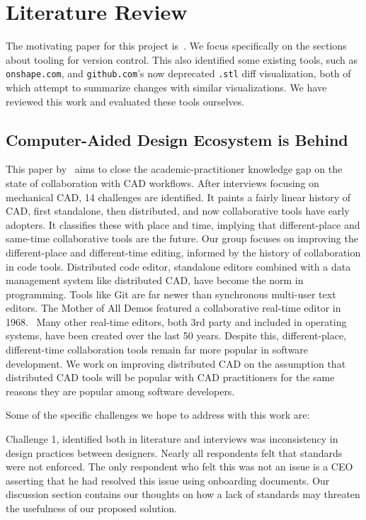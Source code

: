 \documentclass[sigconf,authorversion,nonacm]{acmart}
\begin{document}
\section{Literature Review}

The motivating paper for this project is~\citet{cheng2023age}.
We focus specifically on the sections about tooling for version control.
This also identified some existing tools, such as \texttt{onshape.com}, and \texttt{github.com}'s now deprecated \texttt{.stl} diff visualization, both of which attempt to summarize changes with similar visualizations.
We have reviewed this work and evaluated these tools ourselves.

\subsection{Computer-Aided Design Ecosystem is Behind}

This paper by~\citet{cheng2023age} aims to close the academic-practitioner knowledge gap on the state of collaboration with CAD workflows.
After interviews focusing on mechanical CAD, 14 challenges are identified.
It paints a fairly linear history of CAD, first standalone, then distributed, and now collaborative tools have early adopters.
It classifies these with place and time, implying that different-place and same-time collaborative tools are the future.
Our group focuses on improving the different-place and different-time editing, informed by the history of collaboration in code tools.
Distributed code editor, standalone editors combined with a data management system like distributed CAD, have become the norm in programming.
Tools like Git are far newer than synchronous multi-user text editors.
The Mother of All Demos featured a collaborative real-time editor in 1968.~\cite{motherofalldemos}
Many other real-time editors, both 3rd party and included in operating systems, have been created over the last 50 years.
Despite this, different-place, different-time collaboration tools remain far more popular in software development.
We work on improving distributed CAD on the assumption that distributed CAD tools will be popular with CAD practitioners for the same reasons they are popular among software developers.

Some of the specific challenges we hope to address with this work are:

Challenge 1, identified both in literature and interviews was inconsistency in design practices between designers.
Nearly all respondents felt that standards were not enforced.
The only respondent who felt this was not an issue is a CEO asserting that he had resolved this issue using onboarding documents.
Our discussion section contains our thoughts on how a lack of standards may threaten the usefulness of our proposed solution.
\end{document}
